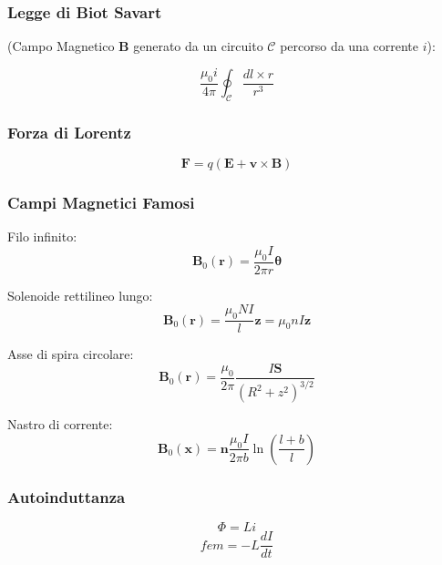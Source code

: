 \documentclass[a4paper]{scrarticle}
\begin{document}
\subsubsection*{Legge di Biot Savart} 
(Campo Magnetico $\bm B$  generato da un circuito $\mathcal{C}$ percorso da una corrente $i$):

\begin{equation}
    \frac{\mu_0 i}{4 \pi} \oint_{\mathcal{C}} \frac {dl \times r}{r^3}
\end{equation}

\subsubsection*{Forza di Lorentz}

\begin{equation}
   \bm F = q (\bm E + \bm v \times \bm B )
\end{equation}

\subsubsection*{Campi Magnetici Famosi}

Filo infinito:
\begin{equation}
    \bm B_0(\bm r) = \frac{\mu_0 I}{2\pi r} \bm \theta
\end{equation}

Solenoide rettilineo lungo:
\begin{equation}
    \bm B_0 (\bm r) = \frac{\mu_0NI}{l} \bm z= \mu_0 nI \bm z
\end{equation}

Asse di spira circolare:
\begin{equation}
    \bm B_0 (\bm r) = \frac{\mu_0}{2\pi} \frac{I \bm S}{(R^2 + z^2)^{3/2}}
\end{equation}

Nastro di corrente:
\begin{equation}
    \bm B_0(\bm x) = \bm n \frac{\mu_0 I}{2\pi b} \ln\left(\frac{l + b}{l}\right)
\end{equation}

\subsubsection*{Autoinduttanza}
\begin{equation}
    \varPhi = L i
\end{equation}
\begin{equation}
    fem = -L \frac{dI}{dt}
\end{equation}
\end{document}
